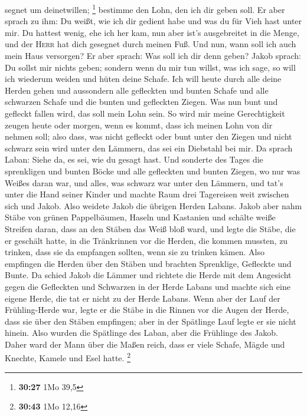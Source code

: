 segnet um deinetwillen; \footnote{\textbf{30:27} 1Mo 39,5}
 bestimme den Lohn, den ich dir geben soll.
 Er aber sprach zu ihm: Du weißt, wie ich dir gedient
habe und was du für Vieh hast unter mir.  Du hattest
wenig, ehe ich her kam, nun aber ist's ausgebreitet in die Menge, und
der \textsc{Herr} hat dich gesegnet durch meinen Fuß. Und nun, wann soll
ich auch mein Haus versorgen?  Er aber sprach: Was soll
ich dir denn geben? Jakob sprach: Du sollst mir nichts geben; sondern
wenn du mir tun willst, was ich sage, so will ich wiederum weiden und
hüten deine Schafe.  Ich will heute durch alle deine
Herden gehen und aussondern alle gefleckten und bunten Schafe und alle
schwarzen Schafe und die bunten und gefleckten Ziegen. Was nun bunt und
gefleckt fallen wird, das soll mein Lohn sein.  So wird
mir meine Gerechtigkeit zeugen heute oder morgen, wenn es kommt, dass
ich meinen Lohn von dir nehmen soll; also dass, was nicht gefleckt oder
bunt unter den Ziegen und nicht schwarz sein wird unter den Lämmern, das
sei ein Diebstahl bei mir.  Da sprach Laban: Siehe da, es
sei, wie du gesagt hast.  Und sonderte des Tages die
sprenkligen und bunten Böcke und alle gefleckten und bunten Ziegen, wo
nur was Weißes daran war, und alles, was schwarz war unter den Lämmern,
und tat's unter die Hand seiner Kinder  und machte Raum
drei Tagereisen weit zwischen sich und Jakob. Also weidete Jakob die
übrigen Herden Labans.  Jakob aber nahm Stäbe von grünen
Pappelbäumen, Haseln und Kastanien und schälte weiße Streifen daran,
dass an den Stäben das Weiß bloß ward,  und legte die
Stäbe, die er geschält hatte, in die Tränkrinnen vor die Herden, die
kommen mussten, zu trinken, dass sie da empfangen sollten, wenn sie zu
trinken kämen.  Also empfingen die Herden über den Stäben
und brachten Sprenklige, Gefleckte und Bunte.  Da schied
Jakob die Lämmer und richtete die Herde mit dem Angesicht gegen die
Gefleckten und Schwarzen in der Herde Labans und machte sich eine eigene
Herde, die tat er nicht zu der Herde Labans.  Wenn aber
der Lauf der Frühling-Herde war, legte er die Stäbe in die Rinnen vor
die Augen der Herde, dass sie über den Stäben empfingen; 
aber in der Spätlinge Lauf legte er sie nicht hinein. Also wurden die
Spätlinge des Laban, aber die Frühlinge des Jakob.  Daher
ward der Mann über die Maßen reich, dass er viele Schafe, Mägde und
Knechte, Kamele und Esel hatte. \footnote{\textbf{30:43} 1Mo 12,16}

